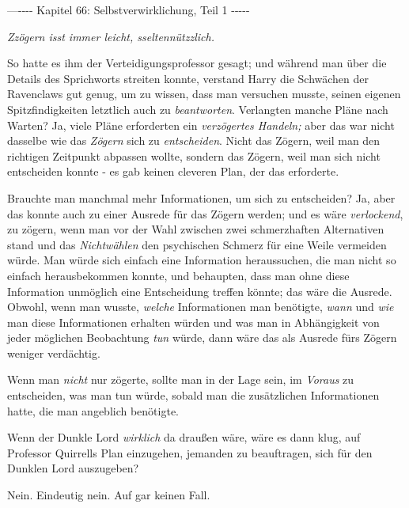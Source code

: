 

\hypertarget{selbstverwirklichung-teil-1}{%

—\/-\/-\/-\/- Kapitel 66: Selbstverwirklichung, Teil 1 -\/-\/-\/-\/-

\emph{\emph{Zzögern} \emph{isst immer leicht,} \emph{sseltennützzlich}.}

So hatte es ihm der Verteidigungsprofessor gesagt; und während man über die Details des Sprichworts streiten konnte, verstand Harry die Schwächen der Ravenclaws gut genug, um zu wissen, dass man versuchen musste, seinen eigenen Spitzfindigkeiten letztlich auch zu \emph{beantworten}. Verlangten manche Pläne nach Warten? Ja, viele Pläne erforderten ein \emph{verzögertes Handeln;} aber das war nicht dasselbe wie das \emph{Zögern} sich zu \emph{entscheiden}. Nicht das Zögern, weil man den richtigen Zeitpunkt abpassen wollte, sondern das Zögern, weil man sich nicht entscheiden konnte - es gab keinen cleveren Plan, der das erforderte.

Brauchte man manchmal mehr Informationen, um sich zu entscheiden? Ja, aber das konnte auch zu einer Ausrede für das Zögern werden; und es wäre \emph{verlockend}, zu zögern, wenn man vor der Wahl zwischen zwei schmerzhaften Alternativen stand und das \emph{Nichtwählen} den psychischen Schmerz für eine Weile vermeiden würde. Man würde sich einfach eine Information heraussuchen, die man nicht so einfach herausbekommen konnte, und behaupten, dass man ohne diese Information unmöglich eine Entscheidung treffen könnte; das wäre die Ausrede. Obwohl, wenn man wusste, \emph{welche} Informationen man benötigte, \emph{wann} und \emph{wie} man diese Informationen erhalten würden und was man in Abhängigkeit von jeder möglichen Beobachtung \emph{tun} würde, dann wäre das als Ausrede fürs Zögern weniger verdächtig.

Wenn man \emph{nicht} nur zögerte, sollte man in der Lage sein, im \emph{Voraus} zu entscheiden, was man tun würde, sobald man die zusätzlichen Informationen hatte, die man angeblich benötigte.

Wenn der Dunkle Lord \emph{wirklich} da draußen wäre, wäre es dann klug, auf Professor Quirrells Plan einzugehen, jemanden zu beauftragen, sich für den Dunklen Lord auszugeben?

Nein. Eindeutig nein. Auf gar keinen Fall.

}

